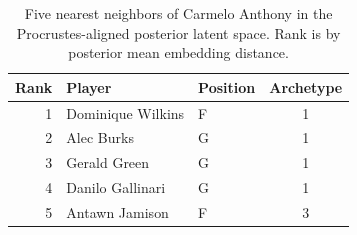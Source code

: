 \begin{table}[htbp]
  \centering\small
  \begin{tabular}{rllc}
    \toprule
    Rank & Player & Position & Archetype \\
    \midrule
    1 & Dominique Wilkins & F & 1 \\
    2 & Alec Burks & G & 1 \\
    3 & Gerald Green & G & 1 \\
    4 & Danilo Gallinari & G & 1 \\
    5 & Antawn Jamison & F & 3 \\
    \bottomrule
  \end{tabular}
  \caption{Five nearest neighbors of Carmelo Anthony in the Procrustes-aligned posterior latent space. Rank is by posterior mean embedding distance.}
  \label{tab:Carmelo_Anthony_neighbors}
\end{table}

